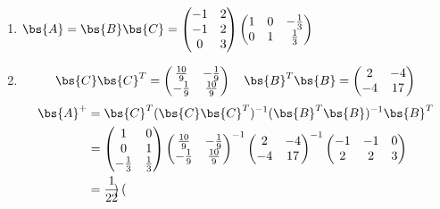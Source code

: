 \documentclass[12pt, a4paper, oneside, UTF8]{ctexbook}
\begin{document}
\begin{solution}
    \begin{enumerate}[label=(\arabic{*})]
        \item $\bs{A}=\bs{B}\bs{C}=\begin{pmatrix}
            -1&2\\
            -1&2\\
            0&3
        \end{pmatrix}\begin{pmatrix}
            1&0&-\frac{1}{3}\\
            0&1&\frac{1}{3}
        \end{pmatrix}$
        \item  
        \begin{align*}
            \bs{C}\bs{C}^T=\begin{pmatrix}
                \frac{10}{9}&-\frac{1}{9}\\
                -\frac{1}{9}&\frac{10}{9}
            \end{pmatrix} \quad \bs{B}^T\bs{B}=\begin{pmatrix}
                2&-4\\
                -4&17
            \end{pmatrix}
        \end{align*}
        \begin{align*}
            \bs{A}^+&=
        \bs{C}^T(\bs{C}\bs{C}^T)^{-1}(\bs{B}^T\bs{B})^{-1}\bs{B}^T\\
        &=\begin{pmatrix}
            1&0\\
            0&1\\
            -\frac{1}{3}&\frac{1}{3}
        \end{pmatrix}\begin{pmatrix}
            \frac{10}{9}&-\frac{1}{9}\\
                -\frac{1}{9}&\frac{10}{9}
        \end{pmatrix}^{-1}\begin{pmatrix}
            2&-4\\
                -4&17
        \end{pmatrix}^{-1}
        \begin{pmatrix}
            -1&-1&0\\
            2&2&3
        \end{pmatrix}\\
        &=\frac{1}{22}\begin{pmatrix}

\end{pmatrix}
\end{align*}
\end{enumerate}
\end{solution}
\end{document}
